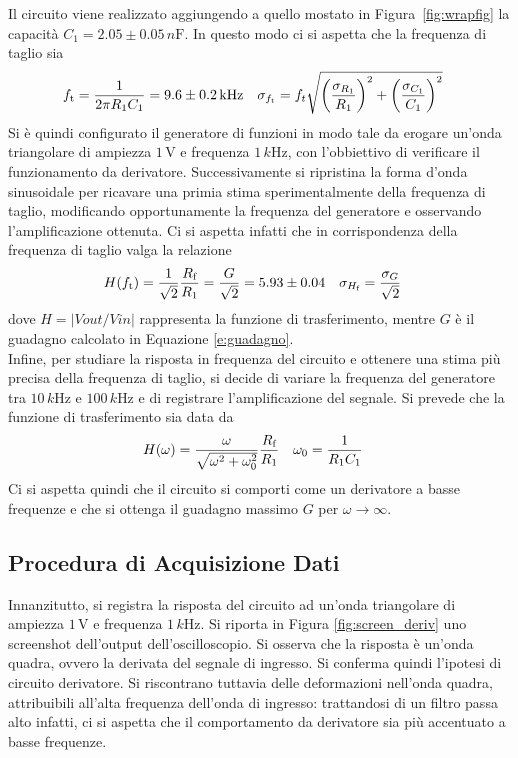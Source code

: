 \documentclass[a4paper,11pt]{article}
\newcommand\V{ \,\si{\volt} }
\begin{document}
Il circuito viene realizzato aggiungendo a quello mostato in Figura~\ref{fig:wrapfig} la
capacità $C_1= 2.05\pm 0.05 \,\si{n\farad}$. In questo modo ci si aspetta che la frequenza di taglio sia
\begin{align}
  \label{eq:f_teo}
  f_{\textrm t} &= \frac{1}{2\pi R_1 C_1} = 9.6 \pm 0.2 \, \si{k\Hz}
  &
  \sigma_{f_{\textrm t}} &= f_t \sqrt{ {\left( \frac{\sigma_{R_1}}{R_1} \right)}^2+
  \left( \frac{\sigma_{C_1}}{C_{1}} \right)^{2}} 
\end{align}
Si è quindi configurato il generatore di
funzioni in modo tale da erogare un'onda triangolare di ampiezza $1 \V$ e frequenza $1 \,\si{k\Hz}$, con
l'obbiettivo di verificare il funzionamento da derivatore. Successivamente si ripristina la
forma d'onda sinusoidale per ricavare una primia stima sperimentalmente della frequenza di taglio,
modificando opportunamente la frequenza del generatore e osservando l'amplificazione ottenuta. Ci si aspetta
infatti che in corrispondenza della frequenza di taglio valga la relazione
\begin{align}
  \label{eq:h_teo}
  H(f_{\text t}) &= \frac{1}{\sqrt 2} \frac{R_{\textrm f}}{R_{1}} =  \frac{G}{\sqrt 2} =  5.93 \pm 0.04
  &
  \sigma_{H_{\textrm f}} & = \frac{\sigma_{G}}{\sqrt 2}
\end{align}
dove $H=|Vout/Vin|$ rappresenta la funzione di trasferimento, mentre $G$ è il guadagno calcolato
in Equazione \ref{e:guadagno}.\\
Infine, per studiare la risposta in frequenza del circuito e ottenere una stima più precisa
della frequenza di taglio, si decide di variare
la frequenza del generatore tra $10 \,\si{k\Hz}$ e $100 \,\si{k\Hz}$
e di registrare l'amplificazione del segnale. Si prevede che la funzione di trasferimento sia data da
\begin{align}
  \label{eq:1}
  H(\omega) &= \frac{\omega}{\sqrt{\omega^{2} + \omega_{0}^{2}}}
              \frac{R_{\textrm f}}{R_{1}}
  &
  \omega_{0} & = \frac{1}{R_{1} C_{1}}
\end{align}
Ci si aspetta quindi che il circuito si comporti come un derivatore a basse frequenze e che si ottenga il guadagno massimo $G$ per $\omega \to \infty$.

\subsection{Procedura di Acquisizione Dati}
\label{sec:acqu-delle-misure}
Innanzitutto, si registra la risposta del circuito ad un'onda triangolare
di ampiezza $1 \V$ e frequenza $1 \, \si{k\Hz}$. Si riporta in Figura \ref{fig:screen_deriv}
uno screenshot dell'output dell'oscilloscopio. Si osserva che la risposta è
un'onda quadra, ovvero la derivata del segnale di ingresso. Si conferma
quindi l'ipotesi di circuito derivatore. Si riscontrano tuttavia delle
deformazioni nell'onda quadra, attribuibili all'alta frequenza dell'onda di
ingresso: trattandosi di un filtro passa alto infatti, ci si aspetta che
il comportamento da derivatore sia più accentuato a basse frequenze.
\end{document}
